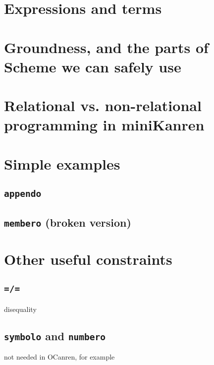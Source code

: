 \documentclass{book}
\begin{document}

\section{Expressions and terms}

\section{Groundness, and the parts of Scheme we can safely use}

\section{Relational vs. non-relational programming in miniKanren}

\section{Simple examples}

\subsection{\texttt{appendo}}

\subsection{\texttt{membero} (broken version)}

\section{Other useful constraints}

\subsection{\texttt{=/=}}

disequality

\subsection{\texttt{symbolo} and \texttt{numbero}}

not needed in OCanren, for example
\end{document}
